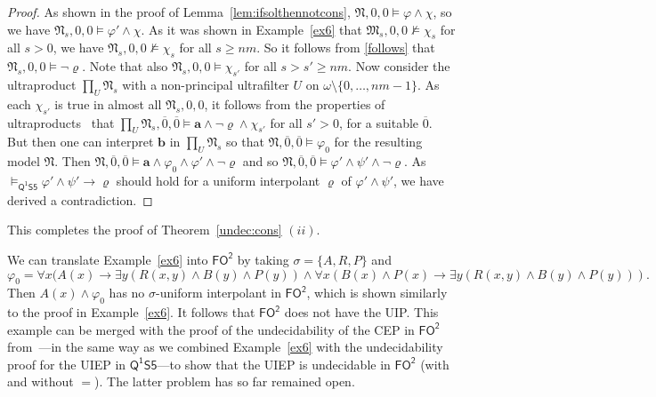 \documentclass{lmcs} %
\theoremstyle{plain}\newtheorem{satz}[thm]{Satz} %
\newcommand{\FOT}{\ensuremath{\mathsf{FO^2}}}
\newcommand{\FOMS}{\ensuremath{\mathsf{Q^1S5}}}
\newcommand{\fform}[1]{\boldsymbol{#1}}
\newcommand{\pvar}{\fform{p}}
\newcommand{\avar}{\fform{a}}
\newcommand{\bvar}{\fform{b}}
\begin{document}
\begin{proof}
			As shown in the proof of Lemma~\ref{lem:ifsolthennotcons}, $\mathfrak{N},0,0\models\varphi\land\chi$, so we have $\mathfrak{N}_s,0,0\models\varphi'\land\chi$.
			As it was shown in Example~\ref{ex6} that $\mathfrak{M}_{s},0,0\not\models \chi_s$ for all $s>0$, we have 
			$\mathfrak{N}_{s},0,0\not\models \chi_s$ for all $s\geq nm$.
			So it follows from \eqref{follows} that $\mathfrak{N}_{s},0,0\models\neg \varrho$.
			Note that also $\mathfrak{N}_{s},0,0\models \chi_{s'}$ for all $s>s'\geq nm$.
			Now consider the ultraproduct $\prod_{U}\mathfrak{N}_{s}$ with a non-principal ultrafilter $U$ on $\omega\setminus\{0,\dots,nm-1\}$. 
			As each $\chi_{s'}$ is true in almost all $\mathfrak{N}_{s},0,0$, it follows from the properties of ultraproducts~\cite{modeltheory} that 
			$\prod_{U}\mathfrak{N}_{s},\overline{0},\overline{0}\models \avar \land \neg \varrho \land\chi_{s'}$ for all $s'>0$, for a suitable $\overline{0}$. But then one can interpret $\bvar$ in $\prod_{U}\mathfrak{N}_{s}$ so that  
			$\mathfrak{N},\overline{0},\overline{0}\models \varphi_{0}$ for the resulting model $\mathfrak{N}$. Then $\mathfrak{N},\overline{0},\overline{0}\models \avar \land \varphi_{0} \land \varphi' \land \neg \varrho$ and so
			$\mathfrak{N},\overline{0},\overline{0}\models\varphi'\land\psi'\land\neg\varrho$.
			As $\models_\FOMS\varphi'\land\psi'\to\varrho$ should hold for
			a uniform interpolant $\varrho$ of $\varphi'\land\psi'$, we have derived a contradiction.	
		\end{proof}
		
		This completes the proof of Theorem~\ref{undec:cons} $(ii)$.
	


\begin{rem}\label{r:FOTUIP}
We can translate Example~\ref{ex6} into \FOT{} by taking $\sigma=\{A,R,P\}$ and 
%
$$
\varphi_{0} = \forall x (A(x) \rightarrow \exists y (R(x,y) \wedge B(y) \wedge P(y)) \land{} 
 \forall x (B(x) \wedge P(x) \rightarrow \exists y (R(x,y) \wedge B(y) \wedge P(y))).
$$
%
Then $A(x) \wedge \varphi_{0}$ has no $\sigma$-uniform interpolant in \FOT{}, which is shown similarly to the proof in Example~\ref{ex6}. It follows that \FOT{} does not have the UIP.
%
This example can be merged with the proof of the undecidability of the CEP in \FOT{} from~\cite{DBLP:conf/icalp/JungLM0W17}---in the same way as we combined Example~\ref{ex6} with the undecidability proof for the UIEP in \FOMS{}---to show that the UIEP is undecidable in \FOT{} \textup{(}with and without $=$\textup{)}. The latter problem has so far remained open.
\end{rem}
\end{document}
